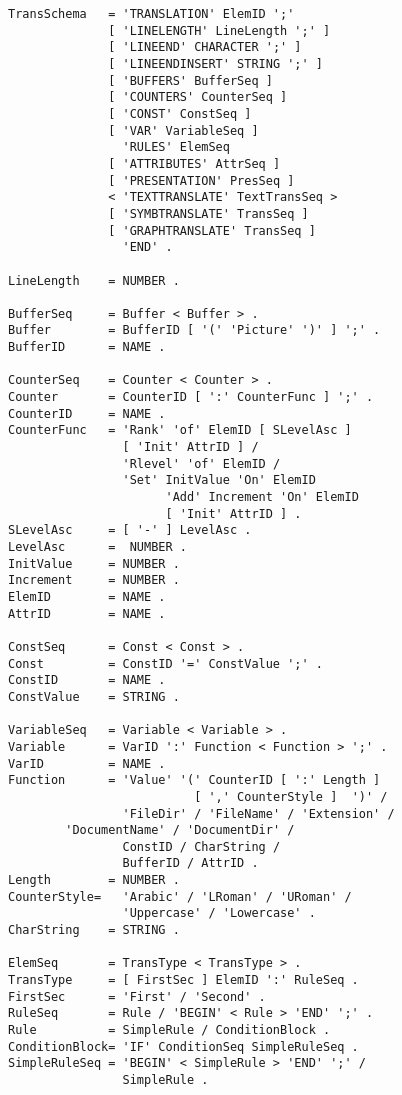 \begin{verbatim}
TransSchema   = 'TRANSLATION' ElemID ';'
              [ 'LINELENGTH' LineLength ';' ]
              [ 'LINEEND' CHARACTER ';' ]
              [ 'LINEENDINSERT' STRING ';' ]
              [ 'BUFFERS' BufferSeq ]
              [ 'COUNTERS' CounterSeq ]
              [ 'CONST' ConstSeq ]
              [ 'VAR' VariableSeq ]
                'RULES' ElemSeq
              [ 'ATTRIBUTES' AttrSeq ]
              [ 'PRESENTATION' PresSeq ]
              < 'TEXTTRANSLATE' TextTransSeq >
              [ 'SYMBTRANSLATE' TransSeq ]
              [ 'GRAPHTRANSLATE' TransSeq ]
                'END' .

LineLength    = NUMBER .

BufferSeq     = Buffer < Buffer > .
Buffer        = BufferID [ '(' 'Picture' ')' ] ';' .
BufferID      = NAME .

CounterSeq    = Counter < Counter > .
Counter       = CounterID [ ':' CounterFunc ] ';' .
CounterID     = NAME .
CounterFunc   = 'Rank' 'of' ElemID [ SLevelAsc ]
                [ 'Init' AttrID ] /
                'Rlevel' 'of' ElemID /
                'Set' InitValue 'On' ElemID
                      'Add' Increment 'On' ElemID
                      [ 'Init' AttrID ] .
SLevelAsc     = [ '-' ] LevelAsc .
LevelAsc      =  NUMBER .
InitValue     = NUMBER .
Increment     = NUMBER .
ElemID        = NAME .
AttrID        = NAME .

ConstSeq      = Const < Const > .
Const         = ConstID '=' ConstValue ';' .
ConstID       = NAME .
ConstValue    = STRING .

VariableSeq   = Variable < Variable > .
Variable      = VarID ':' Function < Function > ';' .
VarID         = NAME .
Function      = 'Value' '(' CounterID [ ':' Length ]
                          [ ',' CounterStyle ]  ')' /
                'FileDir' / 'FileName' / 'Extension' /
		'DocumentName' / 'DocumentDir' /
                ConstID / CharString / 
                BufferID / AttrID .
Length        = NUMBER .
CounterStyle=   'Arabic' / 'LRoman' / 'URoman' /
                'Uppercase' / 'Lowercase' .
CharString    = STRING .

ElemSeq       = TransType < TransType > .
TransType     = [ FirstSec ] ElemID ':' RuleSeq .
FirstSec      = 'First' / 'Second' .
RuleSeq       = Rule / 'BEGIN' < Rule > 'END' ';' .
Rule          = SimpleRule / ConditionBlock .
ConditionBlock= 'IF' ConditionSeq SimpleRuleSeq .
SimpleRuleSeq = 'BEGIN' < SimpleRule > 'END' ';' / 
                SimpleRule .


\end{verbatim}
